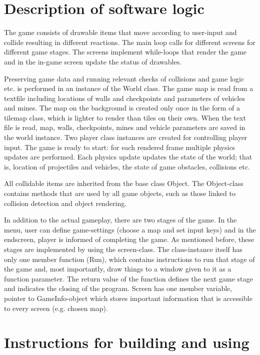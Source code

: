 \documentclass{article} %
\begin{document}
\section{Description of software logic}
The game consists of drawable items that move according to user-input and collide resulting in different reactions. The main loop calls for different screens for different game stages. The screens implement while-loops that render the game and in the in-game screen update the status of drawables.

Preserving game data and running relevant checks of collisions and game logic etc. is performed in an instance of the World class. The game map is read from a textfile including locations of walls and checkpoints and parameters of vehicles and mines. The map on the background is created only once in the form of a tilemap class, which is lighter to render than tiles on their own. When the text file is read, map, walls, checkpoints, mines and vehicle parameters are saved in the world instance. Two player class instances are created for controlling player input. The game is ready to start: for each rendered frame multiple physics updates are performed. Each physics update updates the state of the world; that is, location of projectiles and vehicles, the state of game obstacles, collisions etc. 

All collidable items are inherited from the base class Object.  The Object-class contains methods that are used by all game objects, such as those linked to collision detection and object rendering.


In addition to the actual gameplay, there are two stages of the game. In the menu, user can define game-settings (choose a map and set input keys) and in the endscreen, player is informed of completing the game. As mentioned before, these stages are implemented by using the screen-class. The class-instance itself has only one member function (Run), which contains instructions to run that stage of the game and, most importantly, draw things to a window given to it as a function parameter. The return value of the function defines the next game stage and indicates the closing of the program. Screen has one member variable, pointer to GameInfo-object which stores important information that is accessible to every screen (e.g. chosen map).

\section{Instructions for building and using}
\end{document}
